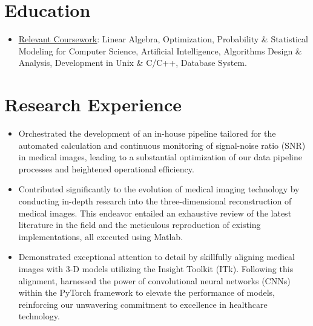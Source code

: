 \documentclass{resume}
\begin{document}



\section{Education}

\begin{itemize}
    \item \underline{{\href{https://catalog.ucdavis.edu/courses-subject-code/}{Relevant Coursework}}}: Linear Algebra, Optimization, Probability \& Statistical Modeling for Computer Science, Artificial Intelligence, Algorithms Design \& Analysis, Development in Unix \& C/C++, Database System.
\end{itemize}

\section{Research Experience}
\begin{itemize}
\item Orchestrated the development of an in-house pipeline tailored for the automated calculation and continuous monitoring of signal-noise ratio (SNR) in medical images, leading to a substantial optimization of our data pipeline processes and heightened operational efficiency.
\item Contributed significantly to the evolution of medical imaging technology by conducting in-depth research into the three-dimensional reconstruction of medical images. This endeavor entailed an exhaustive review of the latest literature in the field and the meticulous reproduction of existing implementations, all executed using Matlab.
\item Demonstrated exceptional attention to detail by skillfully aligning medical images with 3-D models utilizing the Insight Toolkit (ITk). Following this alignment, harnessed the power of convolutional neural networks (CNNs) within the PyTorch framework to elevate the performance of models, reinforcing our unwavering commitment to excellence in healthcare technology.
\end{itemize}
\end{document}
